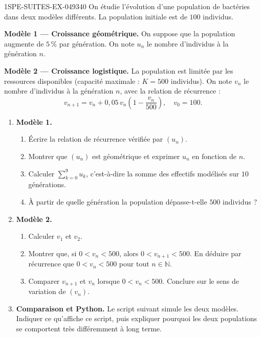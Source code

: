 \begin{exercice}{1SPE-SUITES-EX-049}{3}{40}
On étudie l'évolution d'une population de bactéries dans deux modèles différents. La population initiale est de $100$ individus.

\textbf{Modèle 1 — Croissance géométrique.}
On suppose que la population augmente de $5\,\%$ par génération. On note $u_n$ le nombre d'individus à la génération $n$.

\textbf{Modèle 2 — Croissance logistique.}
La population est limitée par les ressources disponibles (capacité maximale : $K = 500$ individus). On note $v_n$ le nombre d'individus à la génération $n$, avec la relation de récurrence :
\[
  v_{n+1} = v_n + 0{,}05\, v_n \left(1 - \frac{v_n}{500}\right), \quad v_0 = 100.
\]

\begin{enumerate}
  \item \textbf{Modèle 1.}
  \begin{enumerate}
    \item Écrire la relation de récurrence vérifiée par $(u_n)$.
    \item Montrer que $(u_n)$ est géométrique et exprimer $u_n$ en fonction de $n$.
    \item Calculer $\displaystyle\sum_{k=0}^{9} u_k$, c'est-à-dire la somme des effectifs modélisés sur $10$ générations.
    \item À partir de quelle génération la population dépasse-t-elle $500$ individus ?
  \end{enumerate}

  \item \textbf{Modèle 2.}
  \begin{enumerate}
    \item Calculer $v_1$ et $v_2$.
    \item Montrer que, si $0 < v_n < 500$, alors $0 < v_{n+1} < 500$. En déduire par récurrence que $0 < v_n < 500$ pour tout $n \in \mathbb{N}$.
    \item Comparer $v_{n+1}$ et $v_n$ lorsque $0 < v_n < 500$. Conclure sur le sens de variation de $(v_n)$.
  \end{enumerate}

  \item \textbf{Comparaison et Python.} Le script suivant simule les deux modèles. Indiquer ce qu'affiche ce script, puis expliquer pourquoi les deux populations se comportent très différemment à long terme.
\end{enumerate}
\end{exercice}


